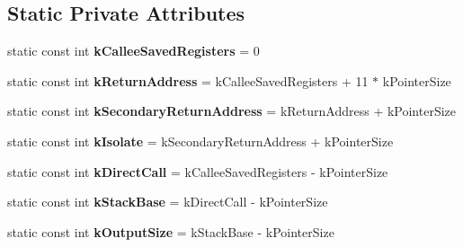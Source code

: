 \subsection*{Static Private Attributes}
\begin{DoxyCompactItemize}
\item 
static const int {\bfseries k\+Callee\+Saved\+Registers} = 0\hypertarget{classv8_1_1internal_1_1_reg_exp_macro_assembler_a_r_m64_a0c234e45396f516163a612d7a9f42cea}{}\label{classv8_1_1internal_1_1_reg_exp_macro_assembler_a_r_m64_a0c234e45396f516163a612d7a9f42cea}

\item 
static const int {\bfseries k\+Return\+Address} = k\+Callee\+Saved\+Registers + 11 $\ast$ k\+Pointer\+Size\hypertarget{classv8_1_1internal_1_1_reg_exp_macro_assembler_a_r_m64_a176c293b16adea6d3fe7ce41edae636b}{}\label{classv8_1_1internal_1_1_reg_exp_macro_assembler_a_r_m64_a176c293b16adea6d3fe7ce41edae636b}

\item 
static const int {\bfseries k\+Secondary\+Return\+Address} = k\+Return\+Address + k\+Pointer\+Size\hypertarget{classv8_1_1internal_1_1_reg_exp_macro_assembler_a_r_m64_ab69f861a15661bfe8feabd5ac35be7c7}{}\label{classv8_1_1internal_1_1_reg_exp_macro_assembler_a_r_m64_ab69f861a15661bfe8feabd5ac35be7c7}

\item 
static const int {\bfseries k\+Isolate} = k\+Secondary\+Return\+Address + k\+Pointer\+Size\hypertarget{classv8_1_1internal_1_1_reg_exp_macro_assembler_a_r_m64_ac3841f53cb40e620d44a30e0d099bb36}{}\label{classv8_1_1internal_1_1_reg_exp_macro_assembler_a_r_m64_ac3841f53cb40e620d44a30e0d099bb36}

\item 
static const int {\bfseries k\+Direct\+Call} = k\+Callee\+Saved\+Registers -\/ k\+Pointer\+Size\hypertarget{classv8_1_1internal_1_1_reg_exp_macro_assembler_a_r_m64_a0694570832d79d59043d3c6c09ad50a3}{}\label{classv8_1_1internal_1_1_reg_exp_macro_assembler_a_r_m64_a0694570832d79d59043d3c6c09ad50a3}

\item 
static const int {\bfseries k\+Stack\+Base} = k\+Direct\+Call -\/ k\+Pointer\+Size\hypertarget{classv8_1_1internal_1_1_reg_exp_macro_assembler_a_r_m64_a5dfc84a82a545346d5c8b12135b01b96}{}\label{classv8_1_1internal_1_1_reg_exp_macro_assembler_a_r_m64_a5dfc84a82a545346d5c8b12135b01b96}

\item 
static const int {\bfseries k\+Output\+Size} = k\+Stack\+Base -\/ k\+Pointer\+Size\hypertarget{classv8_1_1internal_1_1_reg_exp_macro_assembler_a_r_m64_aaf5cdd50a193d68484b36aa1593df349}{}\label{classv8_1_1internal_1_1_reg_exp_macro_assembler_a_r_m64_aaf5cdd50a193d68484b36aa1593df349}


\end{DoxyCompactItemize}
